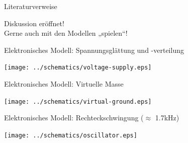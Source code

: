 \documentclass{beamer}
\begin{document}

\begin{frame}[t,allowframebreaks]{Literaturverweise}
  \nocite{Reuter20}
  \printbibliography
\end{frame}

\begin{frame}[t]
  \begin{center}
    \Huge{Diskussion eröffnet!}\\
    \vspace{1cm}
    \large{Gerne auch mit den Modellen „spielen“!}
  \end{center}
\end{frame}




\begin{frame}[fragile]{Elektronisches Modell: Spannungsglättung und -verteilung}
  \begin{center}
    \texttt{[image: ../schematics/voltage-supply.eps]}
  \end{center}
\end{frame}

\begin{frame}[fragile]{Elektronisches Modell: Virtuelle Masse}
  \begin{center}
    \texttt{[image: ../schematics/virtual-ground.eps]}
  \end{center}
\end{frame}

\begin{frame}[fragile]{Elektronisches Modell: Rechteckschwingung ($\approx$ 1.7kHz)}
  \begin{center}
    \texttt{[image: ../schematics/oscillator.eps]}
  \end{center}
\end{frame}
\end{document}
